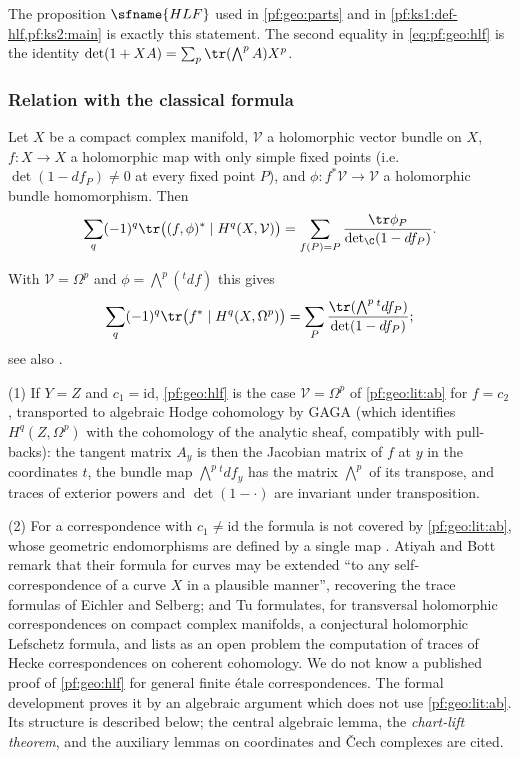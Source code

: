The proposition $\sfname{HLF}$ used in \cref{pf:geo:parts} and in \cref{pf:ks1:def-hlf,pf:ks2:main} is exactly this statement.
The second equality in \eqref{eq:pf:geo:hlf} is the identity $\det(1+XA)=\sum_p\tr(\bigwedge^pA)X^p$.

\subsubsection{Relation with the classical formula}

\begin{littheorem}\label{pf:geo:lit:ab}
Let $X$ be a compact complex manifold, $\mathcal V$ a holomorphic vector bundle on $X$, $f\colon X\to X$ a holomorphic map with only simple fixed
points (i.e.\ $\det(1-df_P)\ne0$ at every fixed point $P$), and $\phi\colon f^*\mathcal V\to\mathcal V$ a holomorphic bundle homomorphism. Then
\[
  \sum_q(-1)^q\tr\bigl((f,\phi)^*\mid H^q(X,\mathcal V)\bigr)=\sum_{f(P)=P}\frac{\tr\phi_P}{\det_\C(1-df_P)}.
\]
\end{littheorem}

With $\mathcal V=\Omega^p$ and $\phi=\bigwedge^p({}^tdf)$ this gives
\[
  \sum_q(-1)^q\tr\bigl(f^*\mid H^q(X,\Omega^p)\bigr)=\sum_P\frac{\tr(\bigwedge^p{}^tdf_P)}{\det(1-df_P)};
\]
see also \cite{ToledoTong1978}.

\begin{remark}\label{pf:geo:rem:hlflit}
(1) If $Y=Z$ and $c_1=\mathrm{id}$, \cref{pf:geo:hlf} is the case $\mathcal V=\Omega^p$ of \cref{pf:geo:lit:ab} for $f=c_2$, transported
to algebraic Hodge cohomology by GAGA \cite{Serre1956} (which identifies $H^q(Z,\Omega^p)$ with the cohomology of the analytic
sheaf, compatibly with pull-backs): the tangent matrix $A_y$ is then the Jacobian matrix of $f$ at $y$ in the coordinates $t$, the
bundle map $\bigwedge^p{}^tdf_y$ has the matrix $\bigwedge^p$ of its transpose, and traces of exterior powers and $\det(1-\cdot)$ are
invariant under transposition.

(2) For a correspondence with $c_1\ne\mathrm{id}$ the formula is not covered by \cref{pf:geo:lit:ab}, whose geometric endomorphisms are
defined by a single map \cite{AtiyahBott1967}. Atiyah and Bott remark \cite[p.~459]{AtiyahBott1968} that their formula for curves may be extended ``to any
self-correspondence of a curve $X$ in a plausible manner'', recovering the trace formulas of Eichler and Selberg; and Tu
\cite{Tu2023} formulates, for transversal holomorphic correspondences on compact complex manifolds, a conjectural holomorphic
Lefschetz formula, and lists as an open problem the computation of traces of Hecke correspondences on coherent cohomology. We
do not know a published proof of \cref{pf:geo:hlf} for general finite \'etale correspondences. The formal development proves it by
an algebraic argument which does not use \cref{pf:geo:lit:ab}. Its structure is described below; the central algebraic lemma,
the \emph{chart-lift theorem}, and the auxiliary lemmas on coordinates and \v{C}ech complexes are cited.
\end{remark}

